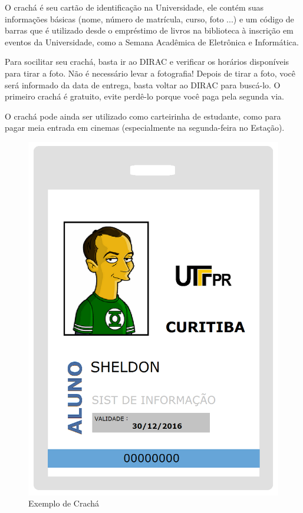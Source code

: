 \documentclass[a4paper,12pt,openany]{article}
\begin{document}
O crachá é seu cartão de identificação na Universidade, ele contém suas informações básicas (nome, número de matrícula, curso, foto ...) e um código de barras que é utilizado desde o empréstimo de livros na biblioteca à inscrição em eventos da Universidade, como a Semana Acadêmica de Eletrônica e Informática. 

Para socilitar seu crachá, basta ir ao DIRAC e verificar os horários disponíveis para tirar a foto. Não é necessário levar a fotografia! Depois de tirar a foto, você será informado da data de entrega, basta voltar ao DIRAC para buscá-lo. O primeiro crachá é gratuito, evite perdê-lo porque você paga pela segunda via.

O crachá pode ainda ser utilizado como carteirinha de estudante, como para pagar meia entrada em cinemas (especialmente na segunda-feira no Estação).

	\begin{figure}[ht!]  \centering
		\includegraphics[scale=0.4]{cracha_sheldon.png}
		\caption{Exemplo de Crachá}
	\end{figure}
\end{document}
